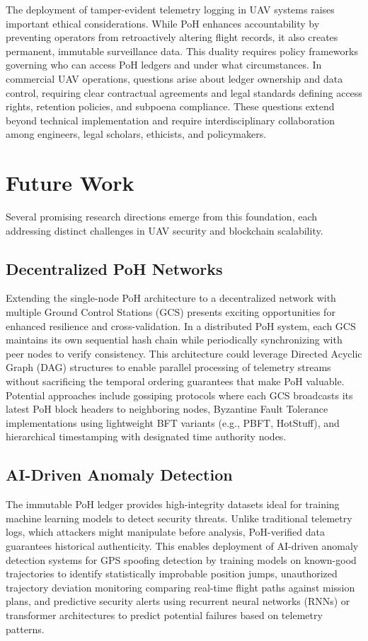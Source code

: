 \documentclass[preprint,12pt]{elsarticle}
\begin{document}
The deployment of tamper-evident telemetry logging in UAV systems raises important ethical considerations. While PoH enhances accountability by preventing operators from retroactively altering flight records, it also creates permanent, immutable surveillance data. This duality requires policy frameworks governing who can access PoH ledgers and under what circumstances. In commercial UAV operations, questions arise about ledger ownership and data control, requiring clear contractual agreements and legal standards defining access rights, retention policies, and subpoena compliance. These questions extend beyond technical implementation and require interdisciplinary collaboration among engineers, legal scholars, ethicists, and policymakers.

\section{Future Work}

Several promising research directions emerge from this foundation, each addressing distinct challenges in UAV security and blockchain scalability.

\subsection{Decentralized PoH Networks}

Extending the single-node PoH architecture to a decentralized network with multiple Ground Control Stations (GCS) presents exciting opportunities for enhanced resilience and cross-validation. In a distributed PoH system, each GCS maintains its own sequential hash chain while periodically synchronizing with peer nodes to verify consistency. This architecture could leverage Directed Acyclic Graph (DAG) structures to enable parallel processing of telemetry streams without sacrificing the temporal ordering guarantees that make PoH valuable. Potential approaches include gossiping protocols where each GCS broadcasts its latest PoH block headers to neighboring nodes, Byzantine Fault Tolerance implementations using lightweight BFT variants (e.g., PBFT, HotStuff), and hierarchical timestamping with designated time authority nodes.

\subsection{AI-Driven Anomaly Detection}

The immutable PoH ledger provides high-integrity datasets ideal for training machine learning models to detect security threats. Unlike traditional telemetry logs, which attackers might manipulate before analysis, PoH-verified data guarantees historical authenticity. This enables deployment of AI-driven anomaly detection systems for GPS spoofing detection by training models on known-good trajectories to identify statistically improbable position jumps, unauthorized trajectory deviation monitoring comparing real-time flight paths against mission plans, and predictive security alerts using recurrent neural networks (RNNs) or transformer architectures to predict potential failures based on telemetry patterns.
\end{document}
